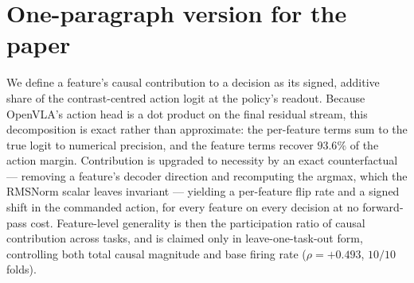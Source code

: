 \documentclass[11pt]{article}
\begin{document}
\section{One-paragraph version for the paper}
\label{sec:paragraph}

We define a feature's causal contribution to a decision as its signed, additive share of the
contrast-centred action logit at the policy's readout. Because OpenVLA's action head is a dot
product on the final residual stream, this decomposition is exact rather than approximate: the
per-feature terms sum to the true logit to numerical precision, and the feature terms recover
$93.6\%$ of the action margin. Contribution is upgraded to necessity by an exact
counterfactual --- removing a feature's decoder direction and recomputing the argmax, which the
RMSNorm scalar leaves invariant --- yielding a per-feature flip rate and a signed shift in the
commanded action, for every feature on every decision at no forward-pass cost. Feature-level
generality is then the participation ratio of causal contribution across tasks, and is claimed
only in leave-one-task-out form, controlling both total causal magnitude and base firing rate
($\rho = +0.493$, $10/10$ folds).
\end{document}
